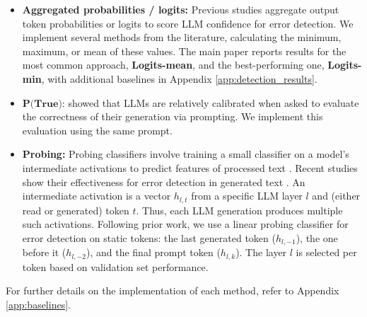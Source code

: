 \documentclass{article} %
\begin{document}
\begin{itemize}
    \item \textbf{Aggregated probabilities / logits:} Previous studies \citep{guerreiro2023looking,kadavath2022language, 
     varshney2023stitch,huang2023look} aggregate output token probabilities or logits to score LLM confidence for error detection.
     We implement several methods from the literature, calculating the minimum, maximum, or mean of these values.
     The main paper reports results for the most common approach, \textbf{Logits-mean}, and the best-performing one, \textbf{Logits-min}, with additional baselines in Appendix \ref{app:detection_results}.
    \item $\textbf{P(True):}$ \citet{kadavath2022language} showed that LLMs are relatively calibrated when asked to evaluate the correctness of their generation via prompting. We implement this evaluation using the same prompt.
    \item \textbf{Probing:}
    Probing classifiers involve training a small classifier on a model's intermediate activations to predict features of processed text \citep{belinkov2021probingclassifierspromisesshortcomings}.
    Recent studies show their effectiveness for error detection in generated text \citep[\textit{inter alia}]{kadavath2022language}.
    An intermediate activation is a vector $h_{l,t}$ from a specific LLM layer $l$ and (either read or generated) token $t$.
    Thus, each LLM generation produces multiple such activations.
    Following prior work, we use a linear probing classifier for error detection \citep[inter alia]{li2024inference} on static tokens: the last generated token ($h_{l,-1}$), the one before it ($h_{l,-2}$), and the final prompt token ($h_{l,k}$).
    The layer $l$ is selected per token based on validation set performance.
\end{itemize}

For further details on the implementation of each method, refer to Appendix \ref{app:baselines}.
\end{document}
